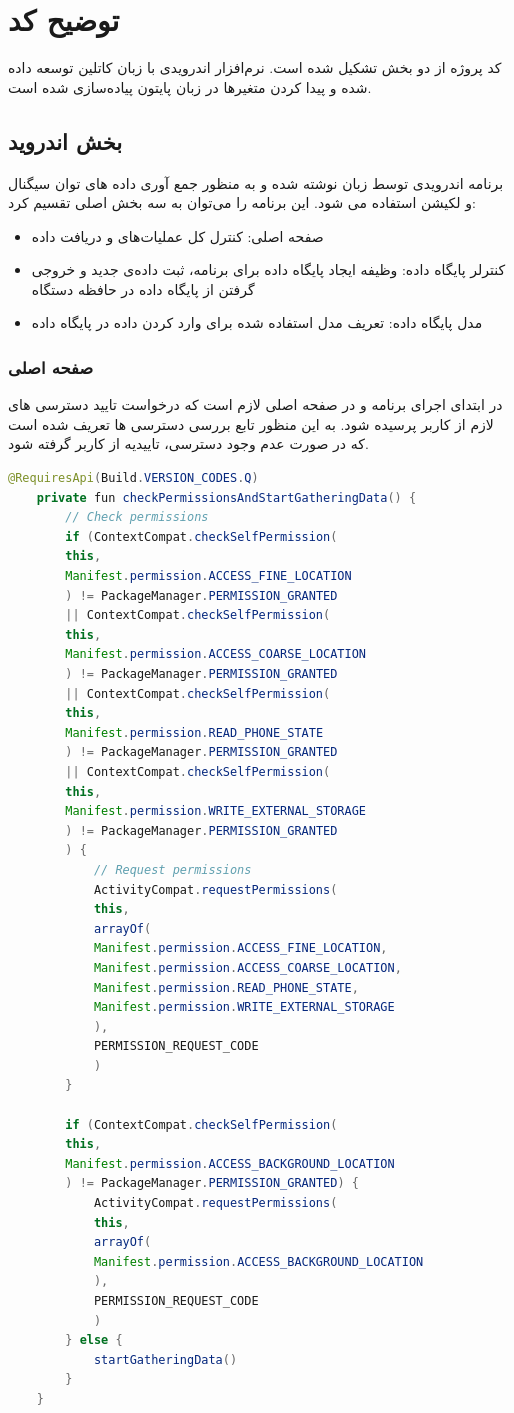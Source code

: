 \section{توضیح کد}
	
کد پروژه از دو بخش تشکیل شده است. نرم‌افزار اندرویدی با زبان کاتلین توسعه داده‌ شده و پیدا کردن متغیرها در زبان پایتون پیاده‌سازی شده است. 
\subsection{بخش اندروید}
برنامه اندرویدی توسط زبان  نوشته شده و به منظور جمع آوری داده های توان سیگنال و لکیشن استفاده می شود. این برنامه را می‌توان به سه بخش اصلی تقسیم کرد:
\begin{itemize}
	\item ‌صفحه اصلی: کنترل کل عملیات‌های  و دریافت داده
	\item کنترلر پایگاه داده: وظیفه ایجاد پایگاه داده برای برنامه، ثبت داده‌ی جدید و خروجی گرفتن از پایگاه داده در حافظه دستگاه
	\item مدل پایگاه داده: تعریف مدل استفاده شده برای وارد کردن داده در پایگاه داده
\end{itemize}

\subsubsection{صفحه اصلی}
در ابتدای اجرای برنامه و در صفحه اصلی لازم است که درخواست تایید دسترسی های لازم از کاربر پرسیده شود. به این منظور تابع بررسی دسترسی ها تعریف شده است که در صورت عدم وجود دسترسی، تاییدیه از کاربر گرفته شود.
\begin{lstlisting}[language=Java]
	@RequiresApi(Build.VERSION_CODES.Q)
	private fun checkPermissionsAndStartGatheringData() {
		// Check permissions
		if (ContextCompat.checkSelfPermission(
		this,
		Manifest.permission.ACCESS_FINE_LOCATION
		) != PackageManager.PERMISSION_GRANTED
		|| ContextCompat.checkSelfPermission(
		this,
		Manifest.permission.ACCESS_COARSE_LOCATION
		) != PackageManager.PERMISSION_GRANTED
		|| ContextCompat.checkSelfPermission(
		this,
		Manifest.permission.READ_PHONE_STATE
		) != PackageManager.PERMISSION_GRANTED
		|| ContextCompat.checkSelfPermission(
		this,
		Manifest.permission.WRITE_EXTERNAL_STORAGE
		) != PackageManager.PERMISSION_GRANTED
		) {
			// Request permissions
			ActivityCompat.requestPermissions(
			this,
			arrayOf(
			Manifest.permission.ACCESS_FINE_LOCATION,
			Manifest.permission.ACCESS_COARSE_LOCATION,
			Manifest.permission.READ_PHONE_STATE,
			Manifest.permission.WRITE_EXTERNAL_STORAGE
			),
			PERMISSION_REQUEST_CODE
			)
		}
		
		if (ContextCompat.checkSelfPermission(
		this,
		Manifest.permission.ACCESS_BACKGROUND_LOCATION
		) != PackageManager.PERMISSION_GRANTED) {
			ActivityCompat.requestPermissions(
			this,
			arrayOf(
			Manifest.permission.ACCESS_BACKGROUND_LOCATION
			),
			PERMISSION_REQUEST_CODE
			)
		} else {
			startGatheringData()
		}
	}
\end{lstlisting}


